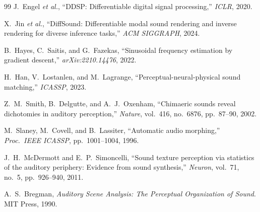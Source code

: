 \documentclass[a4paper,11pt,twoside]{article}
\begin{document}
\begin{thebibliography}{99}
J.~Engel \emph{et al.},
``DDSP: Differentiable digital signal processing,''
\emph{ICLR}, 2020.

X.~Jin \emph{et al.},
``DiffSound: Differentiable modal sound rendering and inverse rendering for diverse inference tasks,''
\emph{ACM SIGGRAPH}, 2024.

B.~Hayes, C.~Saitis, and G.~Fazekas,
``Sinusoidal frequency estimation by gradient descent,''
\emph{arXiv:2210.14476}, 2022.

H.~Han, V.~Lostanlen, and M.~Lagrange,
``Perceptual-neural-physical sound matching,''
\emph{ICASSP}, 2023.

Z.~M.~Smith, B.~Delgutte, and A.~J.~Oxenham,
``Chimaeric sounds reveal dichotomies in auditory perception,''
\emph{Nature}, vol.~416, no.~6876, pp.~87--90, 2002.

M.~Slaney, M.~Covell, and B.~Lassiter,
``Automatic audio morphing,''
\emph{Proc.\ IEEE ICASSP}, pp.~1001--1004, 1996.

J.~H.~McDermott and E.~P.~Simoncelli,
``Sound texture perception via statistics of the auditory periphery: Evidence from sound synthesis,''
\emph{Neuron}, vol.~71, no.~5, pp.~926--940, 2011.

A.~S.~Bregman,
\emph{Auditory Scene Analysis: The Perceptual Organization of Sound}.
MIT Press, 1990.

\end{thebibliography}
\end{document}
